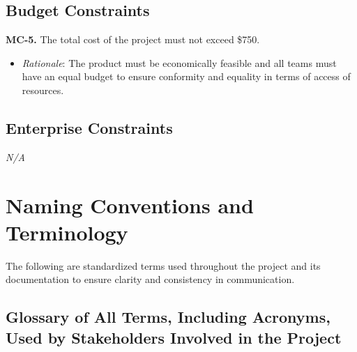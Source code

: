 \documentclass[12pt]{article}
\begin{document}
\subsection{Budget Constraints}
\textbf{MC-5.} The total cost of the project must not exceed \$750.
\begin{itemize}
  \item \emph{Rationale}: The product must be economically feasible and all teams must have an equal budget to ensure conformity and equality in terms of access of resources.
\end{itemize}

\subsection{Enterprise Constraints}
\emph{N/A}

\section{Naming Conventions and Terminology}
The following are standardized terms used throughout the project and its
documentation to ensure clarity and consistency in communication.

\subsection{Glossary of All Terms, Including Acronyms, Used by Stakeholders Involved in the Project}
\end{document}
